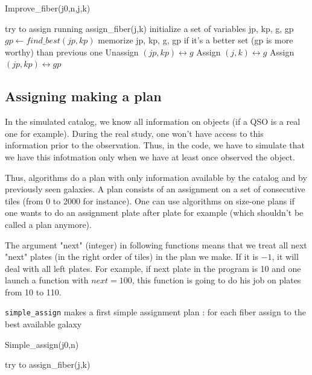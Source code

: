 \documentclass{extarticle}
\begin{document}
\begin{algorithm}[H]
	\caption{Improve\_fiber(j0,n,j,k)}\label{euclid}
	\begin{algorithmic}[1]
		\State try to assign running assign\_fiber(j,k)
		\State initialize a set of variables jp, kp, g, gp
		\State $gp\leftarrow find\_best(jp,kp)$
		\State memorize jp, kp, g, gp if it's a better set (gp is more worthy) than previous one
		\EndFor
		\EndIf
		\EndFor
		\State Unassign $(jp,kp) \longleftrightarrow g$
		\State Assign $(j,k) \longleftrightarrow g$
		\State Assign $(jp,kp) \longleftrightarrow gp$
		\EndIf
		\EndIf
		\EndIf
	\end{algorithmic}
\end{algorithm}


\subsection{Assigning making a plan}
In the simulated catalog, we know all information on objects (if a QSO is a real one for example). During the real study, one won't have access to this information prior to the observation. Thus, in the code, we have to simulate that we have this infotmation only when we have at least once observed the object.

Thus, algorithms do a plan with only information available by the catalog and by previously seen galaxies. A plan consists of an assignment on a set of consecutive tiles (from 0 to 2000 for instance). One can use algorithms on size-one plans if one wants to do an assignment plate after plate for example (which shouldn't be called a plan anymore).

The argument "next" (integer) in following functions means that we treat all next "next" plates (in the right order of tiles) in the plan we make. If it is $-1$, it will deal with all left plates. For example, if next plate in the program is 10 and one launch a function with $next = 100$, this function is going to do his job on plates from 10 to 110.

{\tt simple\_assign} makes a first simple assignment plan : for each fiber assign to the best available galaxy

\begin{algorithm}[H]
	\caption{Simple\_assign(j0,n)}\label{euclid}
	\begin{algorithmic}[1]
		\State try to assign\_fiber(j,k)
		\EndFor
		\EndFor
	\end{algorithmic}
\end{algorithm}
\end{document}

